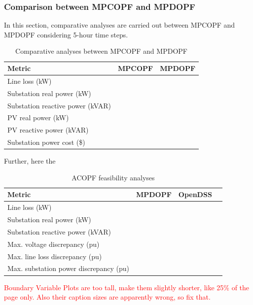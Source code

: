 \documentclass[../../outputs/main.tex]{subfiles}
\begin{document}
\subsubsection{Comparison between MPCOPF and MPDOPF}
In this section, comparative analyses are carried out between MPCOPF and MPDOPF considering 5-hour time steps.


\begin{table}[h!]
    \centering
    \caption{Comparative analyses between MPCOPF and MPDOPF}
    \begin{tabular}{|l|c|c|}
    \hline
    \textbf{Metric} & \textbf{MPCOPF} & \textbf{MPDOPF} \\ \hline
    Line loss (kW) &   &  \\ \hline
    Substation real power (kW) &    &   \\ \hline
    Substation reactive power (kVAR) &    &   \\ \hline
    PV real power (kW) &    &    \\ \hline
    PV reactive power (kVAR) &    &   \\ \hline
    Substation power cost (\$) &     &   \\ \hline
    \end{tabular}
    \label{table:combined_results_slim}
\end{table}


Further, here the 

\begin{table}[h!]
    \centering
    \caption{ACOPF feasibility analyses}
    \begin{tabular}{|l|c|c|c|}
    \hline
    \textbf{Metric} & \textbf{MPDOPF} & \textbf{OpenDSS} \\ \hline
    Line loss (kW) &   &  \\ \hline
    Substation real power (kW) &    &   \\ \hline
    Substation reactive power (kVAR) &    &   \\ \hline
    Max. voltage discrepancy (pu) &    &    \\ \hline
    Max. line loss discrepancy (pu) &    &   \\ \hline
    Max. substation power discrepancy (pu) &     &   \\ \hline
    \end{tabular}
    \label{table:feas-5-}
\end{table}


\textcolor{red}{Boundary Variable Plots are too tall, make them slightly shorter, like 25\% of the page only. Also their caption sizes are apparently wrong, so fix that.}
\end{document}
